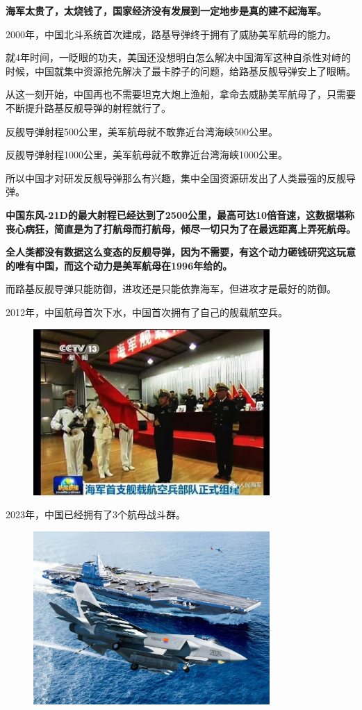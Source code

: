 \documentclass[UTF8, 11pt, oneside]{ctexart}
\newcommand{\zd}[1]{\textbf{\textcolor[RGB]{123,12,0}{#1}}} %
\begin{document}
\zd{海军太贵了，太烧钱了，国家经济没有发展到一定地步是真的建不起海军。}

2000年，中国北斗系统首次建成，路基导弹终于拥有了威胁美军航母的能力。

就4年时间，一眨眼的功夫，美国还没想明白怎么解决中国海军这种自杀性对峙的时候，中国就集中资源抢先解决了最卡脖子的问题，给路基反舰导弹安上了眼睛。

从这一刻开始，中国再也不需要坦克大炮上渔船，拿命去威胁美军航母了，只需要不断提升路基反舰导弹的射程就行了。

反舰导弹射程500公里，美军航母就不敢靠近台湾海峡500公里。

反舰导弹射程1000公里，美军航母就不敢靠近台湾海峡1000公里。

所以中国才对研发反舰导弹那么有兴趣，集中全国资源研发出了人类最强的反舰导弹。

\zd{中国东风-21D的最大射程已经达到了2500公里，最高可达10倍音速，这数据堪称丧心病狂，简直是为了打航母而打航母，倾尽一切只为了在最远距离上弄死航母。}

\zd{全人类都没有数据这么变态的反舰导弹，因为不需要，有这个动力砸钱研究这玩意的唯有中国，而这个动力是美军航母在1996年给的。}

而路基反舰导弹只能防御，进攻还是只能依靠海军，但进攻才是最好的防御。

2012年，中国航母首次下水，中国首次拥有了自己的舰载航空兵。

\begin{figure}[H]
    \centering
    \includegraphics[width=9cm]{2024-08-18-007.jpg}
\end{figure}

2023年，中国已经拥有了3个航母战斗群。

\begin{figure}[H]
    \centering
    \includegraphics[width=9cm]{2024-08-18-008.jpg}
\end{figure}
\end{document}
